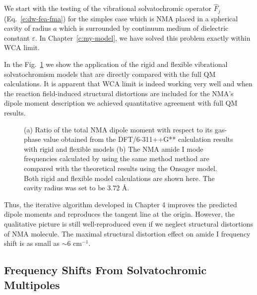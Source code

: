 \documentclass[a4paper,titlepage,twoside,fleqn,12pt]{book}
\begin{document}
\begin{refsection}
We start with the testing of the vibrational solvatochromic 
operator $\hat{F}_j$ (Eq.~\eqref{e:dw-fea-fma}) 
for the simples case which is NMA
placed in a spherical cavity of radius $a$ which is surrounded
by continuum medium of dielectric constant $\varepsilon$.
In Chapter~\ref{c:my-model}, we have solved this problem exactly within
WCA limit. 

In the Fig.~\ref{f:onsager} we show the application of the rigid
and flexible vibrational solvatochromism models that are directly
compared with the full QM calculations. It is apparent that WCA
limit is indeed working very well and when the reaction field\hyp{}induced 
structural distortions
are included for the NMA's dipole moment description 
we achieved quantitative agreement
with full QM results. 
%
\begin{figure}[t!]
\centering
\setlength\fboxsep{0.4pt}
\setlength\fboxrule{0.5pt}
\caption{
(a) Ratio of the total NMA dipole moment with respect to its gas\hyp{}phase
value obtained from the DFT/6-311++G** calculation results with rigid and flexible
models (b) The NMA amide I mode frequencies calculated by using the same method
method are compared with the theoretical results using the Onsager model. 
Both rigid and flexible model calculations are shown here. The cavity radius was set
to be 3.72 \AA.
\label{f:onsager}}
\end{figure}
%
Thus, the
iterative algorithm developed in Chapter 4 improves the predicted
dipole moments and reproduces the tangent line at the origin.
However, the qualitative
picture is still well\hyp{}reproduced even if we neglect
structural distortions of NMA molecule. The maximal structural
distortion effect on amide I frequency shift is as small
as $\sim$6 cm$^{-1}$.

\subsection{Frequency Shifts From Solvatochromic Multipoles\label{s:amide-I-solvatochr-multipoles}}


\end{refsection}
\end{document}
